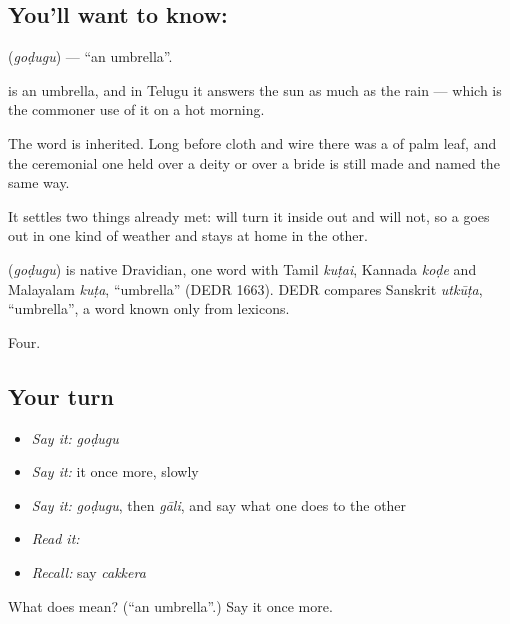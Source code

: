 \subsection*{You'll want to know: }
\textbf{} (\emph{goḍugu}) — \textquotedblleft{}an umbrella\textquotedblright{}.

 is an umbrella, and in Telugu it answers the sun as much as the rain — which is the commoner use of it on a hot morning.

The word is inherited. Long before cloth and wire there was a  of palm leaf, and the ceremonial one held over a deity or over a bride is still made and named the same way.

It settles two things already met:  will turn it inside out and  will not, so a  goes out in one kind of weather and stays at home in the other.

\begin{cousinweb}
\textbf{} (\emph{goḍugu}) is native Dravidian, one word with Tamil \emph{kuṭai}, Kannada \emph{koḍe} and Malayalam \emph{kuṭa}, \textquotedblleft{}umbrella\textquotedblright{} (DEDR 1663). DEDR compares Sanskrit \emph{utkūṭa}, \textquotedblleft{}umbrella\textquotedblright{}, a word known only from lexicons.
\end{cousinweb}

\begin{grammarlens}[title={What you've built}]
Four.
\end{grammarlens}

\subsection*{Your turn}
\begin{itemize}
\raggedright
  \item \emph{Say it:} \emph{goḍugu}
  \item \emph{Say it:} it once more, slowly
  \item \emph{Say it:} \emph{goḍugu}, then \emph{gāli}, and say what one does to the other
  \item \emph{Read it:} \textbf{}
  \item \emph{Recall:} say \emph{cakkera}
\end{itemize}

\begin{tcolorbox}[breakable,colback=teal!4,colframe=teal!35!black,title={Before you move on}]
What does  mean? (\textquotedblleft{}an umbrella\textquotedblright{}.) Say it once more.
\end{tcolorbox}
